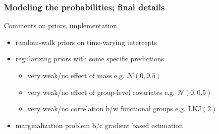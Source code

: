 \documentclass[aspectratio=169]{beamer}
\begin{document}
\begin{frame}
  \frametitle{Modeling the probabilities; final details}

  \begin{block}{Comments on priors, implementation}
    \setlength\abovedisplayskip{-0.1cm}
    \begin{itemize}
      \item random-walk priors on time-varying intercepts
      \item regularizing priors with some specific predictions
        \begin{itemize}
          \item very weak/no effect of mass e.g. \(\mathcal{N}(0, 0.5)\)
          \item very weak/no effect of group-level covariates e.g. \(\mathcal{N}(0, 0.5)\)
          \item very weak/no correlation b/w functional groups e.g. LKJ\((2)\)
        \end{itemize}
      \item marginalization problem b/c gradient based estimation
    \end{itemize}
  \end{block}
\end{frame}
\end{document}
